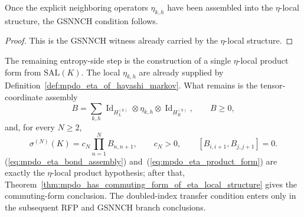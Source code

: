 \begin{theorem}
    \label{thm:mpdo_is_gsnnch_of_eta_local_structure}
    \leanok
    Once the explicit neighboring operators $\eta_{k,h}$ have been assembled
    into the $\eta$-local structure, the GSNNCH condition follows.
\end{theorem}

\begin{proof}\leanok
    This is the GSNNCH witness already carried by the $\eta$-local structure.
\end{proof}

\begin{remark}
    The remaining entropy-side step is the construction of a single
    $\eta$-local product form from $\mathrm{SAL}(K)$. The local $\eta_{k,h}$
    are already supplied by
    Definition~\ref{def:mpdo_eta_of_hayashi_markov}. What remains is the
    tensor-coordinate assembly
    \begin{equation}\label{eq:mpdo_eta_bond_assembly}
        B=\sum_{k,h}
        \operatorname{Id}_{H_L^{(k)}}\otimes
        \eta_{k,h}\otimes
        \operatorname{Id}_{H_R^{(h)}},
        \qquad B\ge 0,
    \end{equation}
    and, for every $N\ge 2$,
    \begin{equation}\label{eq:mpdo_eta_product_form}
        \sigma^{(N)}(K)=c_N\prod_{n=1}^{N}B_{n,n+1},
        \qquad c_N>0,\qquad
        [B_{i,i+1},B_{j,j+1}]=0.
    \end{equation}
    (\ref{eq:mpdo_eta_bond_assembly}) and~(\ref{eq:mpdo_eta_product_form}) are
    exactly the $\eta$-local product hypothesis; after that,
    Theorem~\ref{thm:mpdo_has_commuting_form_of_eta_local_structure}
    gives the commuting-form conclusion. The doubled-index transfer condition
    enters only in the subsequent RFP and GSNNCH branch conclusions.
\end{remark}
